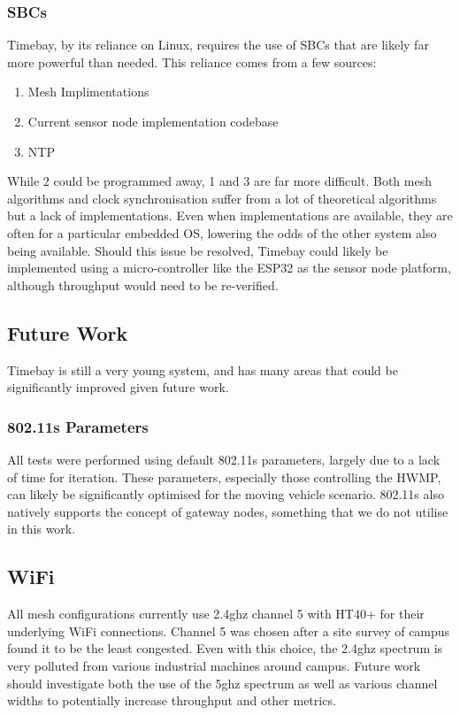 \documentclass[journal]{IEEEtran}
\begin{document}
\subsubsection{SBCs}
Timebay, by its reliance on Linux, requires the use of SBCs that are likely far more powerful than needed. This reliance comes from a few sources:
\begin{enumerate}
    \item Mesh Implimentations
    \item Current sensor node implementation codebase
    \item NTP
\end{enumerate}
While 2 could be programmed away, 1 and 3 are far more difficult. Both mesh algorithms and clock synchronisation suffer from a lot of theoretical algorithms but a lack of implementations. Even when implementations are available, they are often for a particular embedded OS, lowering the odds of the other system also being available. Should this issue be resolved, Timebay could likely be implemented using a micro-controller like the ESP32 as the sensor node platform, although throughput would need to be re-verified.

\subsection{Future Work}
Timebay is still a very young system, and has many areas that could be significantly improved given future work. 

\subsubsection{802.11s Parameters}
All tests were performed using default 802.11s parameters, largely due to a lack of time for iteration. These parameters, especially those controlling the HWMP, can likely be significantly optimised for the moving vehicle scenario. 802.11s also natively supports the concept of gateway nodes, something that we do not utilise in this work.

\subsection{WiFi}
All mesh configurations currently use 2.4ghz channel 5 with HT40+ for their underlying WiFi connections. Channel 5 was chosen after a site survey of campus found it to be the least congested. Even with this choice, the 2.4ghz spectrum is very polluted from various industrial machines around campus. Future work should investigate both the use of the 5ghz spectrum as well as various channel widths to potentially increase throughput and other metrics.
\end{document}
